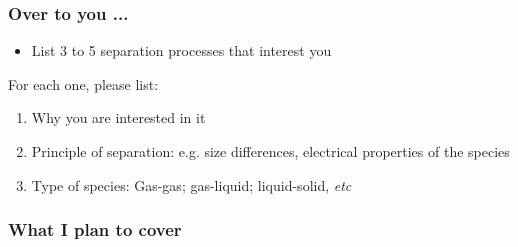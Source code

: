 \begin{frame}\frametitle{Over to you ...}
	\begin{itemize}
		\item	List 3 to 5 separation processes that interest you
	\end{itemize}
	\vspace{12pt}
	For each one, please list:
	\begin{enumerate}
		\item	Why you are interested in it
		\item	Principle of separation: e.g. size differences, electrical properties of the species
		\item	Type of species: Gas-gas; gas-liquid; liquid-solid, \emph{etc}
	\end{enumerate}
\end{frame}

\begin{frame}\frametitle{What I plan to cover}
	\begin{center}
		\hspace{3cm}
	\end{center}
\end{frame}